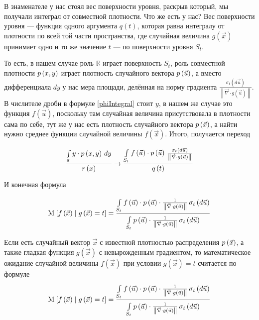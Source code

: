 В знаменателе у нас стоял вес поверхности уровня,
раскрыв который, мы получали интеграл от совместной плотности.
Что же есть у нас?
Вес поверхности уровня --- функция одного аргумента $q\left( t \right)$,
которая равна интегралу от плотности по всей той части пространства,
где случайная величина $g\left( \vec{x} \right)$
принимает одно и то же значение $t$ --- по поверхности уровня $S_t$.

То есть, в нашем случае роль $\mathbb{R}$ играет поверхность $S_t$,
роль совместной плотности $\pdf{x,y}$ играет плотность случайного вектора
$\pdf{\vec{u}}$, а вместо дифференциала $dy$ у нас мера площади,
делённая на норму градиента $\frac{\sigma_{t}\left( d\vec{u} \right)}
{\left\| \vec{\nabla} \cdot g\left( \vec{u} \right) \right\|}$.
В числителе дроби в формуле \eqref{phiIntegral} стоит $y$,
в нашем же случае это функция $f\left( \vec{u} \right)$,
поскольку там случайная величина присутствовала в плотности сама по себе,
тут же у нас есть плотность случайного вектора $\pdf{\vec{x}}$,
а найти нужно среднее функции случайной величины $f\left( \vec{x} \right)$.
Итого, получается переход

$$\frac{\integral{\mathbb{R}}{}{y}{y \cdot \pdf{x,y}}}{r\left( x \right)}
    \rightarrow
        \frac{\integrall{S_t}{\frac{\sigma_{t}\left( d\vec{u} \right)}{
            \left\| \vec{\nabla} \cdot g\left( \vec{u} \right) \right\|}}{
            f\left( \vec{u} \right) \cdot \pdf{\vec{u}}}}{q\left( t \right)}$$

И конечная формула

$$\Mean{ f\left( \vec{x} \right) \mcond g\left( \vec{x} \right) = t }
    = \frac{\integrall{S_t}{\sigma_{t}\left(d\vec{u} \right)}{
        f\left( \vec{u} \right) \cdot \pdf{\vec{u}} \cdot \frac{1}{
            \left\| \vec{\nabla} \cdot g\left( \vec{u} \right) \right\|}}}
        {\integrall{S_t}{\sigma_{t}\left(d\vec{u} \right)}{
            \pdf{\vec{u}} \cdot \frac{1}{
                \left\| \vec{\nabla} \cdot g\left( \vec{u} \right) \right\|}}}$$

\begin{theorem}
    \label{conditionalExpectationDefinition}
    Если есть случайный вектор $\vec{x}$ с известной плотностью распределения
    $\pdf{\vec{x}}$, а также гладкая функция $g\left( \vec{x} \right)$
    с невырожденным градиентом, то математическое ожидание случайной величины
    $f\left( \vec{x} \right)$ при условии $g\left( \vec{x} \right) = t$
    считается по формуле
    $$\Mean{f\left( \vec{x} \right) \mcond g\left( \vec{x} \right) = t}
        = \frac{\integrall{S_t}{\sigma_{t}\left(d\vec{u} \right)}{
            f\left( \vec{u} \right) \cdot \pdf{\vec{u}} \cdot \frac{1}{
                \left\| \vec{\nabla} \cdot g\left( \vec{u} \right) \right\|}}}
            {\integrall{S_t}{\sigma_{t}\left(d\vec{u} \right)}{
                \pdf{\vec{u}} \cdot \frac{1}{
                    \left\| \vec{\nabla}
                        \cdot g\left( \vec{u} \right) \right\|}}}$$
\end{theorem}

